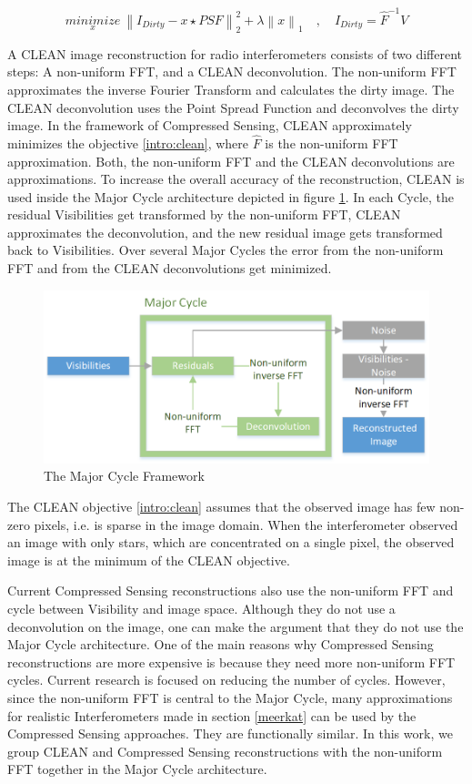 \begin{equation}\label{intro:clean}
\underset{x}{minimize} \: \left \|  I_{Dirty} - x \star PSF \right \|_2^2 + \lambda \left \| x \right \|_1 \quad, \quad I_{Dirty} = \hat{F}^{-1} V
\end{equation}

A CLEAN image reconstruction for radio interferometers consists of two different steps: A non-uniform FFT, and a CLEAN deconvolution. The non-uniform FFT approximates the inverse Fourier Transform and calculates the dirty image. The CLEAN deconvolution uses the Point Spread Function and deconvolves the dirty image. In the framework of Compressed Sensing, CLEAN approximately minimizes the objective \eqref{intro:clean}, where $\hat{F}$ is the non-uniform FFT approximation. Both, the non-uniform FFT and the CLEAN deconvolutions are approximations. To increase the overall accuracy of the reconstruction, CLEAN is used inside the Major Cycle architecture depicted in figure \ref{intro:major}. In each Cycle, the residual Visibilities get transformed by the non-uniform FFT, CLEAN approximates the deconvolution, and the new residual image gets transformed back to Visibilities. Over several Major Cycles the error from the non-uniform FFT and from the CLEAN deconvolutions get minimized. 

\begin{figure}
	\centering
	\includegraphics[width=0.80\linewidth]{./chapters/01.intro/Major-Minor.png}
	\caption{The Major Cycle Framework}
	\label{intro:major}
\end{figure}

The CLEAN objective \eqref{intro:clean} assumes that the observed image has few non-zero pixels, i.e. is sparse in the image domain. When the interferometer observed an image with only stars, which are concentrated on a single pixel, the observed image is at the minimum of the CLEAN objective. 

Current Compressed Sensing reconstructions also use the non-uniform FFT and cycle between Visibility and image space\cite{girard2015sparse,dabbech2018cygnus}. Although they do not use a deconvolution on the image, one can make the argument that they do not use the Major Cycle architecture. One of the main reasons why Compressed Sensing reconstructions are more expensive is because they need more non-uniform FFT cycles. Current research is focused on reducing the number of cycles\cite{dabbech2018cygnus}. However, since the non-uniform FFT is central to the Major Cycle, many approximations for realistic Interferometers made in section \ref{meerkat} can be used by the Compressed Sensing approaches. They are functionally similar. In this work, we group CLEAN and Compressed Sensing reconstructions with the non-uniform FFT together in the Major Cycle architecture.

 






